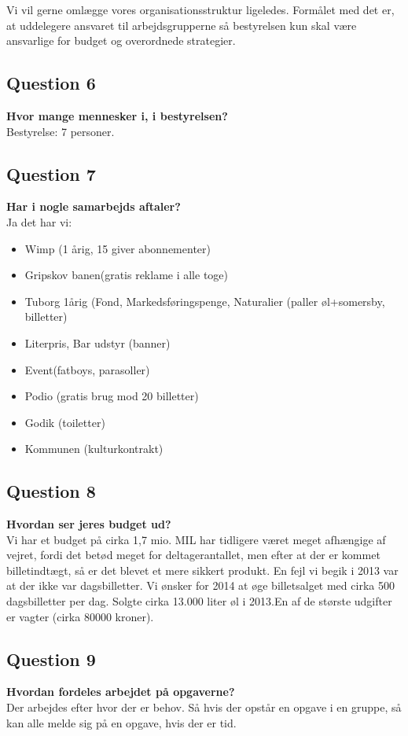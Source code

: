 Vi vil gerne omlægge vores organisationsstruktur ligeledes. Formålet med det er, at uddelegere ansvaret til arbejdsgrupperne så bestyrelsen kun skal være ansvarlige for budget og overordnede strategier. 

\subsection{Question 6}
\noindent \textbf{Hvor mange mennesker i, i bestyrelsen?} \\
Bestyrelse: 7 personer.

\subsection{Question 7}
\noindent \textbf{Har i nogle samarbejds aftaler?} \\
Ja det har vi: 
\begin{itemize}
	\item Wimp (1 årig, 15 giver abonnementer)
	\item Gripskov banen(gratis reklame i alle toge)
	\item Tuborg 1årig (Fond, Markedsføringspenge, Naturalier (paller øl+somersby, billetter)
	\item Literpris, Bar udstyr (banner)
	\item Event(fatboys, parasoller)
	\item Podio (gratis brug mod 20 billetter)
	\item Godik (toiletter)
	\item Kommunen (kulturkontrakt)
\end{itemize}

\subsection{Question 8}
\noindent \textbf{Hvordan ser jeres budget ud?} \\
Vi har et budget på cirka 1,7 mio. MIL har tidligere været meget afhængige af vejret, fordi det betød meget for deltagerantallet, men efter at der er kommet billetindtægt, så er det blevet et mere sikkert produkt. En fejl vi begik i 2013 var at der ikke var dagsbilletter. Vi ønsker for 2014 at øge billetsalget med cirka 500 dagsbilletter per dag. Solgte cirka 13.000 liter øl i 2013.En af de største udgifter er vagter (cirka 80000 kroner).

\subsection{Question 9}
\noindent \textbf{Hvordan fordeles arbejdet på opgaverne?} \\
Der arbejdes efter hvor der er behov. Så hvis der opstår en opgave i en gruppe, så kan alle melde sig på en opgave, hvis der er tid. 


